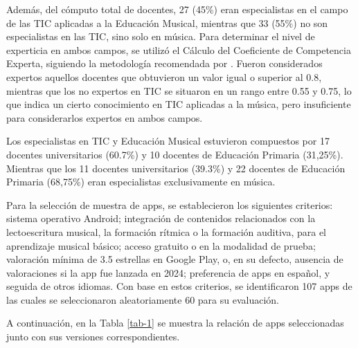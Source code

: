 \documentclass[spanish]{textolivre}
\begin{document}
Además, del cómputo total de docentes, 27 (45\%) eran especialistas en el campo de las TIC aplicadas a la Educación Musical, mientras que 33 (55\%) no son especialistas en las TIC, sino solo en música. Para determinar el nivel de experticia en ambos campos, se utilizó el Cálculo del Coeficiente de Competencia Experta, siguiendo la metodología recomendada por \textcite{cabero-almenara2020, herrera2023}. Fueron considerados expertos aquellos docentes que obtuvieron un valor igual o superior al 0.8, mientras que los no expertos en TIC se situaron en un rango entre 0.55 y 0.75, lo que indica un cierto conocimiento en TIC aplicadas a la música, pero insuficiente para considerarlos expertos en ambos campos.  

Los especialistas en TIC y Educación Musical estuvieron compuestos por 17 docentes universitarios (60.7\%) y 10 docentes de Educación Primaria (31,25\%). Mientras que los 11 docentes universitarios (39.3\%) y 22 docentes de Educación Primaria (68,75\%) eran especialistas exclusivamente en música.

Para la selección de muestra de apps, se establecieron los siguientes criterios: sistema operativo Android; integración de contenidos relacionados con la lectoescritura musical, la formación rítmica o la formación auditiva, para el aprendizaje musical básico; acceso gratuito o en la modalidad de prueba; valoración mínima de 3.5 estrellas en Google Play, o, en su defecto, ausencia de valoraciones si la app fue lanzada en 2024; preferencia de apps en español, y seguida de otros idiomas. Con base en estos criterios, se identificaron 107 apps de las cuales se seleccionaron aleatoriamente 60 para su evaluación.

A continuación, en la Tabla \ref{tab-1} se muestra la relación de apps seleccionadas junto con sus versiones correspondientes. 
\end{document}
